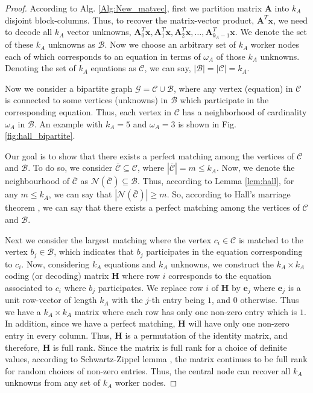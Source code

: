 \documentclass[conference]{IEEEtran}
\theoremstyle{definition}
\newcommand{\calB}{\mathcal{B}}
\newcommand{\calC}{\mathcal{C}}
\newcommand{\calG}{\mathcal{G}}
\newcommand{\calN}{\mathcal{N}}
\newcommand{\bfH}{\mathbf{H}}
\newcommand{\bfA}{\mathbf{A}}
\newcommand{\bfx}{\mathbf{x}}
\newcommand{\bfe}{\mathbf{e}}
\begin{document}
\begin{proof}
According to Alg. \ref{Alg:New_matvec}, first we partition matrix $\bfA$ into $k_A$ disjoint block-columns. Thus, to recover the matrix-vector product, $\bfA^T \bfx$, we need to decode all $k_A$ vector unknowns, $\bfA^T_0 \bfx, \bfA^T_1 \bfx, \bfA^T_2 \bfx, \dots, \bfA^T_{k_A - 1} \bfx$. We denote the set of these $k_A$ unknowns as $\calB$. Now we choose an arbitrary set of $k_A$ worker nodes each of which corresponds to an equation in terms of $\omega_A$ of those $k_A$ unknowns. Denoting the set of $k_A$ equations as $\calC$, we can say,  $|\calB| = |\calC| = k_A$. 


Now we consider a bipartite graph $\calG = \calC \cup \calB$, where any vertex (equation) in $\calC$ is connected to some vertices (unknowns) in $\calB$ which participate in the corresponding equation. Thus, each vertex in $\calC$ has a neighborhood of cardinality $\omega_A$ in $\calB$. An example with $k_A = 5$ and $\omega_A = 3$ is shown in Fig. \ref{fig:hall_bipartite}. 

Our goal is to show that there exists a perfect matching among the vertices of $\calC$ and $\calB$. To do so, we consider $\bar{\calC} \subseteq \calC$, where $|\bar{\calC}| = m \leq k_A$. Now, we denote the neighbourhood of $\bar{\calC}$  as $\calN (\bar{\calC}) \subseteq \calB$. Thus, according to Lemma \ref{lem:hall}, for any $m \leq k_A$, we can say that $|\calN (\bar{\calC})| \geq m$. So, according to Hall's marriage theorem \cite{marshall1986combinatorial}, we can say that there exists a perfect matching among the vertices of $\calC$ and $\calB$.

Next we consider the largest matching where the vertex $c_i \in \calC$ is matched to the vertex $b_j \in \calB$, which indicates that $b_j$ participates in the equation corresponding to $c_i$. Now, considering $k_A$ equations and $k_A$ unknowns, we construct the $k_A \times k_A$ coding (or decoding) matrix $\bfH$ where row $i$ corresponds to the equation associated to $c_i$ where $b_j$ participates. We replace row $i$ of $\bfH$ by $\bfe_j$ where $\bfe_j$ is a unit row-vector of length $k_A$ with the $j$-th entry being $1$, and $0$ otherwise. Thus we have a $k_A \times k_A$ matrix where each row has only one non-zero entry which is $1$. In addition, since we have a perfect matching, $\bfH$ will have only one non-zero entry in every column. Thus, $\bfH$ is a permutation of the identity matrix, and therefore, $\bfH$ is full rank. Since the matrix is full rank for a choice of definite values, according to Schwartz-Zippel lemma \cite{schwartz1980fast}, the matrix continues to be full rank for random choices of non-zero entries. Thus, the central node can recover all $k_A$ unknowns from any set of $k_A$ worker nodes.
\end{proof}
\end{document}
